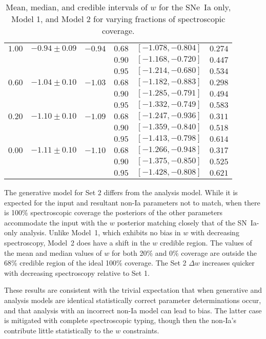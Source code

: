 \documentclass[preprint,3p]{elsarticle}
\begin{document}
\begin{table}
\begin{tabular}{|c|cc|ccc|}
$1.00$ &$-0.94 \pm  0.09$ &$-0.94$ &$0.68$ & $[-1.078, -0.804]$ & $0.274$ \\
&&&$0.90$ & $[-1.168, -0.720]$ & $0.447$ \\
&&&$0.95$ & $[-1.214, -0.680]$ & $0.534$ \\
\hline
$0.60$ &$-1.04 \pm  0.10$ & $-1.03$ &$0.68$ & $[-1.182, -0.883]$ & $0.298$ \\
& & &$0.90$ & $[-1.285, -0.791]$ & $0.494$ \\
& & &$0.95$ & $[-1.332, -0.749]$ & $0.583$ \\
\hline
$0.20$ &$-1.10 \pm  0.10$ & $-1.09$ &$0.68$ & $[-1.247, -0.936]$ & $0.311$ \\
& & &$0.90$ & $[-1.359, -0.840]$ & $0.518$ \\
& & &$0.95$ & $[-1.413, -0.798]$ & $0.614$ \\
\hline
$0.00$ &$-1.11 \pm  0.10$ & $-1.10$ &$0.68$ & $[-1.266, -0.948]$ & $0.317$ \\
& & &$0.90$ & $[-1.375, -0.850]$ & $0.525$ \\
& & &$0.95$ & $[-1.428, -0.808]$ & $0.621$ \\
\hline
\end{tabular}
\caption{Mean, median, and credible intervals of $w$ for the SNe~Ia only,
Model 1, and Model 2 for varying
fractions of spectroscopic coverage. \label{seed2:tab}}
\end{table}

The generative model for Set 2 differs from the analysis model.
While it is expected for the input and resultant non-Ia parameters not to match, 
when there is 100\% spectroscopic coverage the posteriors of the other
parameters accommodate the input with the $w$ posterior matching
closely that of the SN~Ia-only analysis.  Unlike Model~1, which exhibits no bias
in $w$ with decreasing spectroscopy, Model~2 does have a shift in the $w$
credible region.  
The values of the mean and median values of
$w$ for both 20\% and 0\% coverage are outside the 68\%
credible region of the ideal 100\% coverage.
The Set 2 $\Delta w$ increases quicker with decreasing spectroscopy
relative to Set 1.

These results are consistent with the trivial expectation that when generative
and analysis models are identical statistically correct parameter determinations
occur, and that analysis with an incorrect non-Ia model can lead to bias.
The latter case is mitigated with complete spectroscopic typing, though then
the non-Ia's contribute little statistically to the $w$ constraints. 
\end{document}
